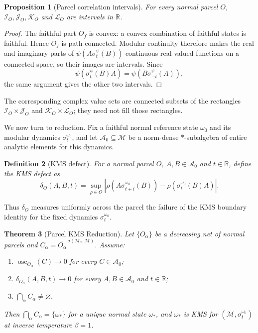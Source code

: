 \documentclass[11pt]{article}
\newtheorem{theorem}{Theorem}[section]
\newtheorem{definition}[theorem]{Definition}
\newtheorem{proposition}[theorem]{Proposition}
\begin{document}
\begin{proposition}[Parcel correlation intervals]
\label{prop:solid}
For every normal parcel $O$, $\mathcal I_O,\mathcal J_O,\mathcal K_O$
and $\mathcal L_O$ are intervals in $\mathbb R$.
\end{proposition}

\begin{proof}
The faithful part $O_f$ is convex: a convex combination of faithful
states is faithful. Hence $O_f$ is path connected. Modular continuity
therefore makes the real and imaginary parts of
$\psi(A\sigma_t^\psi(B))$ continuous real-valued functions on a connected
space, so their images are intervals. Since
\[
\psi(\sigma_t^\psi(B)A)
=
\psi(B\sigma_{-t}^\psi(A)),
\]
the same argument gives the other two intervals.
\end{proof}

The corresponding complex value sets are connected subsets of the
rectangles $\mathcal I_O\times\mathcal J_O$ and
$\mathcal K_O\times\mathcal L_O$; they need not fill those rectangles.

We now turn to reduction. Fix a faithful normal reference state
$\omega_0$ and its modular dynamics $\sigma_t^{\omega_0}$, and let
$\mathcal A_0\subseteq\mathcal M$ be a norm-dense $*$-subalgebra of
entire analytic elements for this dynamics.

\begin{definition}[KMS defect]
\label{def:kmsdefect}
For a normal parcel $O$, $A,B\in\mathcal A_0$ and $t\in\mathbb R$, define the {\em KMS defect} as 
\[
\delta_O(A,B,t)
=
\sup_{\rho\in O}
\left|
\rho(A\sigma_{t+i}^{\omega_0}(B))
-
\rho(\sigma_t^{\omega_0}(B)A)
\right|.
\]
\end{definition}

Thus $\delta_O$ measures uniformly across the parcel the failure of the
KMS boundary identity for the fixed dynamics $\sigma_t^{\omega_0}$.

\begin{theorem}[Parcel KMS Reduction]
\label{thm:kmsreduction}
Let $\{O_\alpha\}$ be a decreasing net of normal parcels and
$C_\alpha=\overline{O_\alpha}^{\,\sigma(\mathcal M_*,\mathcal M)}$.
Assume:
\begin{enumerate}
\item[\rm(i)] $\operatorname{osc}_{O_\alpha}(C)\to0$ for every
$C\in\mathcal A_0$;
\item[\rm(ii)] $\delta_{O_\alpha}(A,B,t)\to0$ for every
$A,B\in\mathcal A_0$ and $t\in\mathbb R$;
\item[\rm(iii)] $\bigcap_\alpha C_\alpha\neq\varnothing$.
\end{enumerate}
Then $\bigcap_\alpha C_\alpha=\{\omega_*\}$ for a unique normal state
$\omega_*$, and $\omega_*$ is KMS for
$(\mathcal M,\sigma_t^{\omega_0})$ at inverse temperature $\beta=1$.
\end{theorem}
\end{document}
